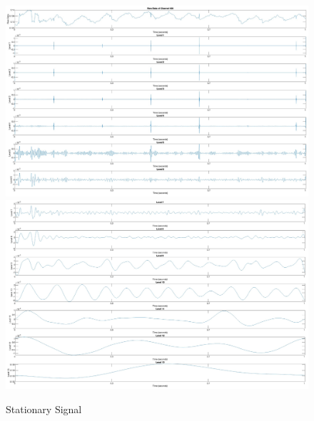 \begin{figure}[p]
    \centering
    \includegraphics[width=\textwidth]{img/lev1.png}
    \includegraphics[width=\textwidth]{img/lev2.png}
    \caption{Stationary Signal}
    \label{fig:level1}
\end{figure}

